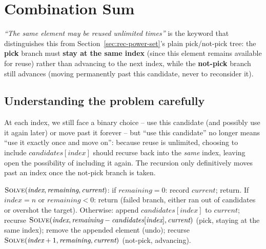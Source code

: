 \section{Combination Sum}
\label{sec:rec-combination-sum}


\begin{patternbox}
\emph{``The same element may be reused unlimited times''} is the
keyword that distinguishes this from Section~\ref{sec:rec-power-set}'s
plain pick/not-pick tree: the \textbf{pick} branch must \textbf{stay at
the same index} (since this element remains available for reuse) rather
than advancing to the next index, while the \textbf{not-pick} branch
still advances (moving permanently past this candidate, never to
reconsider it).
\end{patternbox}

\subsection*{Understanding the problem carefully}

At each index, we still face a binary choice -- use this candidate (and
possibly use it again later) or move past it forever -- but ``use this
candidate'' no longer means ``use it exactly once and move on'': because
reuse is unlimited, choosing to include $\textit{candidates}[\textit{index}]$
should recurse back into the \emph{same} index, leaving open the
possibility of including it again. The recursion only definitively moves
past an index once the not-pick branch is taken.

\begin{ideabox}
$\textsc{Solve}(\textit{index}, \textit{remaining}, \textit{current})$:
if $\textit{remaining}=0$: record $\textit{current}$; return. If
$\textit{index}=n$ or $\textit{remaining}<0$: return (failed branch,
either ran out of candidates or overshot the target). Otherwise: append
$\textit{candidates}[\textit{index}]$ to $\textit{current}$; recurse
$\textsc{Solve}(\textit{index}, \textit{remaining} -
\textit{candidates}[\textit{index}], \textit{current})$ (pick, staying
at the same index); remove the appended element (undo); recurse
$\textsc{Solve}(\textit{index}+1, \textit{remaining}, \textit{current})$
(not-pick, advancing).
\end{ideabox}

